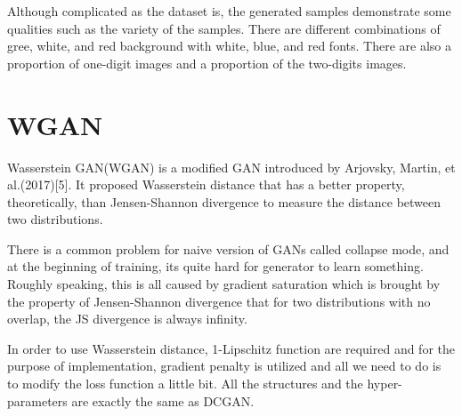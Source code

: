 \documentclass{article}
\begin{document}
Although complicated as the dataset is, the generated samples demonstrate some qualities such as the variety of the samples. There are different combinations of gree, white, and red background with white, blue, and red fonts.
There are also a proportion of one-digit images and a proportion of the two-digits images.

\section{WGAN}

Wasserstein GAN(WGAN) is a modified GAN introduced by Arjovsky, Martin, et al.(2017)[5]. It proposed Wasserstein distance that has a better property, theoretically, than Jensen-Shannon divergence to measure the distance between two distributions. 

There is a common problem for naive version of GANs called collapse mode, and at the beginning of training, its quite hard for generator to learn something. Roughly speaking, this is all caused by gradient saturation which is brought by the property of Jensen-Shannon divergence that for two distributions with no overlap, the JS divergence is always infinity. 

In order to use Wasserstein distance, 1-Lipschitz function are required and for the purpose of implementation, gradient penalty is utilized and all we need to do is to modify the loss function a little bit. All the structures and the hyper-parameters are exactly the same as DCGAN.  
\end{document}

